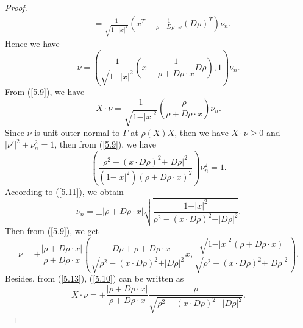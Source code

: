 \documentclass[a4paper,12pt,]{article}
\numberwithin{equation}{section}
\numberwithin{equation}{section} \allowdisplaybreaks
\begin{document}
\begin{proof}
\begin{align*}
     & = \frac{1}{\sqrt{1 - \vert x \vert^{2}}}\left(x^{T} - \frac{1}{\rho + D\rho \cdot x}(D\rho)^{T}\right)\nu_{n}.
  \end{align*}
  Hence we have
  \begin{equation}\label{5.9}
    \nu = \left(\frac{1}{\sqrt{1 - \vert x \vert^{2}}}\left(x - \frac{1}{\rho + D\rho \cdot x}D\rho\right),1\right)\nu_{n}.
  \end{equation}
  From (\ref{5.9}), we have
  \begin{equation}\label{5.10}
    X\cdot \nu = \frac{1}{\sqrt{1 - \vert x \vert^{2}}}\left(\frac{\rho}{\rho + D\rho \cdot x}\right)\nu_{n}.
  \end{equation}
  Since $\nu$ is unit outer normal to $\Gamma$ at $\rho(X)X$, then we have $X\cdot \nu \geq 0$ and $\vert \nu' \vert^{2} + \nu_{n}^{2} = 1$, then from (\ref{5.9}), we have
  \begin{equation}\label{5.11}
    \left(\frac{\rho^{2} - (x \cdot D\rho)^{2} + \vert D\rho \vert^{2}}{(1 - \vert x \vert^{2})(\rho + D\rho \cdot x)^{2}}\right)\nu_{n}^{2} = 1.
  \end{equation}
  According to (\ref{5.11}), we obtain
  \begin{equation}\label{5.12}
    \nu_{n} = \pm \vert \rho + D\rho \cdot x \vert\sqrt{\frac{1-\vert x \vert^{2}}{\rho^{2} - (x \cdot D\rho)^{2} + \vert D\rho \vert^{2}}}.
  \end{equation}
  Then from (\ref{5.9}), we get
  \begin{equation}\label{5.13}
    \nu = \pm \frac{\vert \rho + D\rho \cdot x \vert}{\rho + D\rho \cdot x}\left(\frac{-D\rho +\rho + D\rho \cdot x}{\sqrt{\rho^{2} - (x \cdot D\rho)^{2} + \vert D\rho \vert^{2}}}x,\frac{\sqrt{1 - \vert x \vert^{2}}(\rho + D\rho \cdot x)}{\sqrt{\rho^{2} - (x \cdot D\rho)^{2} + \vert D\rho \vert^{2}}}\right).
  \end{equation}
  Besides, from (\ref{5.13}), (\ref{5.10}) can be written as
  \begin{equation*}
    X\cdot \nu = \pm \frac{\vert \rho + D\rho \cdot x \vert}{\rho + D\rho \cdot x}\frac{\rho}{\sqrt{\rho^{2} - (x \cdot D\rho)^{2} + \vert D\rho \vert^{2}}}.
  \end{equation*}


\end{proof}
\end{document}
